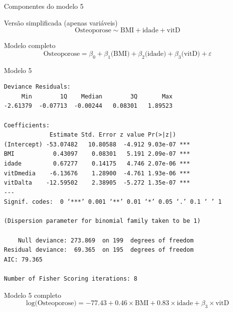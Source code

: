 \documentclass{beamer}
\begin{document}
\begin{frame}{\scriptsize Componentes do modelo 5}
  \begin{block}{\footnotesize Versão simplificada (apenas variáveis)}
    \footnotesize
    \begin{displaymath}
      \text{Osteoporose} \sim \text{BMI} + \text{idade} + \text{vitD}
    \end{displaymath}
  \end{block}
  \bigskip
  \bigskip
  \begin{block}{Modelo completo}
    \footnotesize
    \begin{displaymath}
      \text{Osteoporose} =\beta_0 + \beta_1 \text{(BMI)} + \beta_2 \text{(idade)} + \beta_3 \text{(vitD)} +\varepsilon
    \end{displaymath}
  \end{block}
  \vfill
\end{frame}

\begin{frame}[fragile]{\scriptsize }
  \begin{center}
    \begin{exampleblock}{Modelo 5}
      \tiny
\begin{verbatim}
Deviance Residuals: 
     Min        1Q    Median        3Q       Max  
-2.61379  -0.07713  -0.00244   0.08301   1.89523  

Coefficients:
             Estimate Std. Error z value Pr(>|z|)    
(Intercept) -53.07482   10.80588  -4.912 9.03e-07 ***
BMI           0.43097    0.08301   5.191 2.09e-07 ***
idade         0.67277    0.14175   4.746 2.07e-06 ***
vitDmedia    -6.13676    1.28900  -4.761 1.93e-06 ***
vitDalta    -12.59502    2.38905  -5.272 1.35e-07 ***
---
Signif. codes:  0 ‘***’ 0.001 ‘**’ 0.01 ‘*’ 0.05 ‘.’ 0.1 ‘ ’ 1

(Dispersion parameter for binomial family taken to be 1)

    Null deviance: 273.869  on 199  degrees of freedom
Residual deviance:  69.365  on 195  degrees of freedom
AIC: 79.365

Number of Fisher Scoring iterations: 8
\end{verbatim}
    \end{exampleblock}
  \begin{exampleblock}{Modelo 5 completo}
    \footnotesize
    \begin{displaymath}
      \text{log(Osteoporose)} =-77.43 + 0.46 \times\text{BMI} + 0.83 \times\text{idade} + \beta_3 \times\text{vitD}
    \end{displaymath}
  \end{exampleblock}
  \end{center}
\end{frame}
\end{document}

